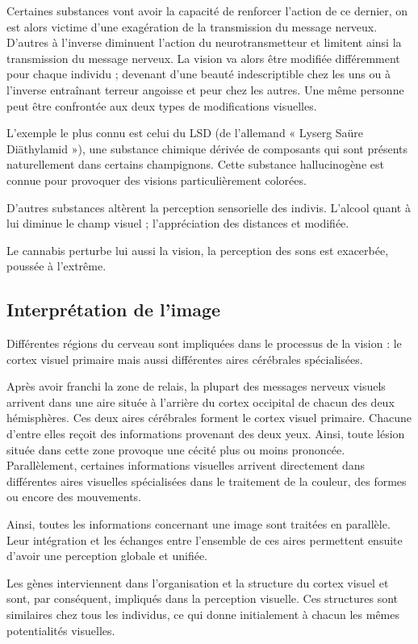 \documentclass[a4paper, 12pt, onecolumn, openany]{report}
\begin{document}
	Certaines substances vont avoir la capacité de renforcer l’action de ce dernier, on est alors victime d’une exagération de la transmission du message nerveux. D’autres à l’inverse diminuent l’action du neurotransmetteur et limitent ainsi la transmission du message nerveux. La vision va alors être modifiée différemment pour chaque individu ; devenant d’une beauté indescriptible chez les uns ou à l’inverse entraînant terreur angoisse et peur chez les autres. Une même personne peut être confrontée aux deux types de modifications visuelles. 
	
	L’exemple le plus connu est celui du LSD (de l’allemand « Lyserg Saüre Diäthylamid »), une substance chimique dérivée de composants qui sont présents naturellement dans certains champignons. Cette substance hallucinogène est connue pour provoquer des visions particulièrement colorées. 
	
	D’autres substances altèrent la perception sensorielle des indivis. L’alcool quant à lui diminue le champ visuel ; l’appréciation des distances et modifiée. 
	
	Le cannabis perturbe lui aussi la vision, la perception des sons est exacerbée, poussée à l’extrême. 

\newpage
		\subsection{Interprétation de l'image}
		Différentes régions du cerveau sont impliquées dans le processus de la vision : le cortex visuel primaire mais aussi différentes aires cérébrales spécialisées.
		
	Après avoir franchi la zone de relais, la plupart des messages nerveux visuels arrivent dans une aire située à l'arrière du cortex occipital de chacun des deux hémisphères. Ces deux aires cérébrales forment le cortex visuel primaire. Chacune d'entre elles reçoit des informations provenant des deux yeux. Ainsi, toute lésion située dans cette zone provoque une cécité plus ou moins prononcée. Parallèlement, certaines informations visuelles arrivent directement dans différentes aires visuelles spécialisées dans le traitement de la couleur, des formes ou encore des mouvements.
	
	Ainsi, toutes les informations concernant une image sont traitées en parallèle. Leur intégration et les échanges entre l'ensemble de ces aires permettent ensuite d'avoir une perception globale et unifiée.
	
	Les gènes interviennent dans l'organisation et la structure du cortex visuel et sont, par conséquent, impliqués dans la perception visuelle. Ces structures sont similaires chez tous les individus, ce qui donne initialement à chacun les mêmes potentialités visuelles.
	
\end{document}
